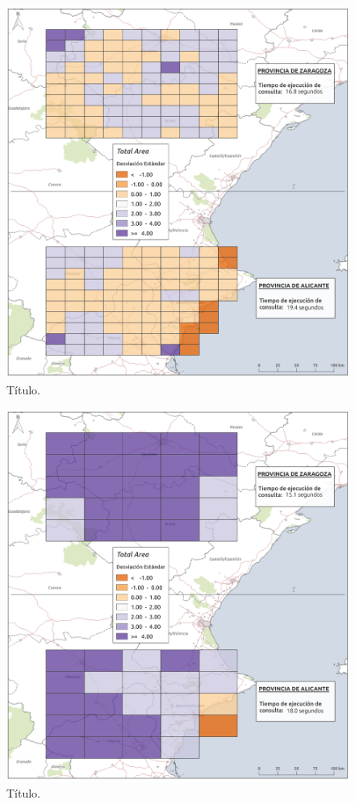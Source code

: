 \begin{figure}
\begin{center}
\includegraphics[width=\textwidth]{ResultadosyDiscusion/Figs/Results/l_50.png}
\caption{Título. \label{fig:l_50}}
\end{center}
\end{figure}

\begin{figure}
\begin{center}
\includegraphics[width=\textwidth]{ResultadosyDiscusion/Figs/Results/l_100.png}
\caption{Título. \label{fig:l_100}}
\end{center}
\end{figure}